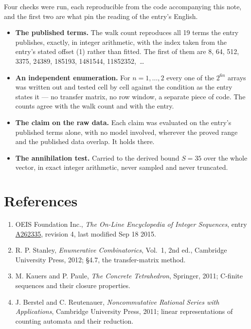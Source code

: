 \documentclass[11pt]{article}
\theoremstyle{definition}
\begin{document}
Four checks were run, each reproducible from the code accompanying this note, and the first two are what pin the reading of the entry's English.

\begin{itemize}

\item {\bfseries The published terms.} The walk count reproduces all 19 terms the entry publishes, exactly, in integer arithmetic, with the index taken from the entry's stated offset (1) rather than fitted. The first of them are 8, 64, 512, 3375, 24389, 185193, 1481544, 11852352,~\dots

\item {\bfseries An independent enumeration.} For $n = 1,\dots,2$ every one of the $2^{6n}$ arrays was written out and tested cell by cell against the condition as the entry states it --- no transfer matrix, no row window, a separate piece of code. The counts agree with the walk count and with the entry.

\item {\bfseries The claim on the raw data.} Each claim was evaluated on the entry's published terms alone, with no model involved, wherever the proved range and the published data overlap. It holds there.

\item {\bfseries The annihilation test.} Carried to the derived bound $S = 35$ over the whole vector, in exact integer arithmetic, never sampled and never truncated.

\end{itemize}

\section{References}

\begin{enumerate}

\item OEIS Foundation Inc., \emph{The On-Line Encyclopedia of Integer Sequences}, entry \href{https://oeis.org/A262335}{A262335}, revision 4, last modified Sep 18 2015.

\item R. P. Stanley, \emph{Enumerative Combinatorics}, Vol.~1, 2nd ed., Cambridge University Press, 2012; \S4.7, the transfer-matrix method.

\item M. Kauers and P. Paule, \emph{The Concrete Tetrahedron}, Springer, 2011; C-finite sequences and their closure properties.

\item J. Berstel and C. Reutenauer, \emph{Noncommutative Rational Series with Applications}, Cambridge University Press, 2011; linear representations of counting automata and their reduction.

\end{enumerate}
\end{document}
